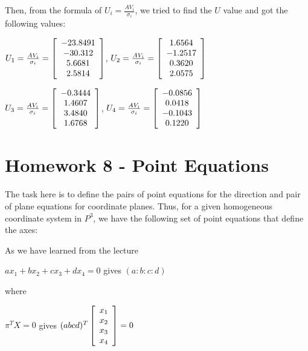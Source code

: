 \documentclass[]{article}
\begin{document}
\vspace{1.0em}

Then, from the formula of $U_i = \frac{AV_i}{\sigma _i}$, we tried to find the $U$ value and got the following values:

\centerline  {
	$U_1 = \frac{AV_i}{\sigma _i} = \left[ {\begin{array}{*{20}c}
		-23.8491 \\
		-30.312 \\ 
		5.6681 \\
		2.5814  
		\end{array} } \right] $, 	$U_2 = \frac{AV_i}{\sigma _i} = \left[ {\begin{array}{*{20}c}
		1.6564 \\
		-1.2517 \\ 
		0.3620 \\
		2.0575  
		\end{array} } \right] $
}

\vspace{1.0em}

\centerline {
	$U_3 = \frac{AV_i}{\sigma _i} = \left[ {\begin{array}{*{20}c}
		-0.3444 \\
		1.4607 \\ 
		3.4840 \\
		1.6768  
		\end{array} } \right] $, 	$U_4 = \frac{AV_i}{\sigma _i} = \left[ {\begin{array}{*{20}c}
		-0.0856 \\
		0.0418 \\ 
		-0.1043 \\
		0.1220  
		\end{array} } \right] $
}


\section{Homework 8 - Point Equations}
The task here is to define the pairs of point equations for the direction and pair of plane equations for coordinate planes. Thus, for a given homogeneous coordinate system in $P^3$, we have the following set of point equations that define the axes:

As we have learned from the lecture 

\centerline {
	$ax_1 + bx_2 + cx_3 + dx_4 = 0$ gives $(a: b: c: d)$
}

where 

\centerline {
	$\pi ^TX = 0$ gives  $(a b c d)^T \left[ {\begin{array}{*{20}c}
		x_1 \\
		x_2 \\ 
		x_3 \\
		x_4   
		\end{array} } \right] = 0$
}
\end{document}
